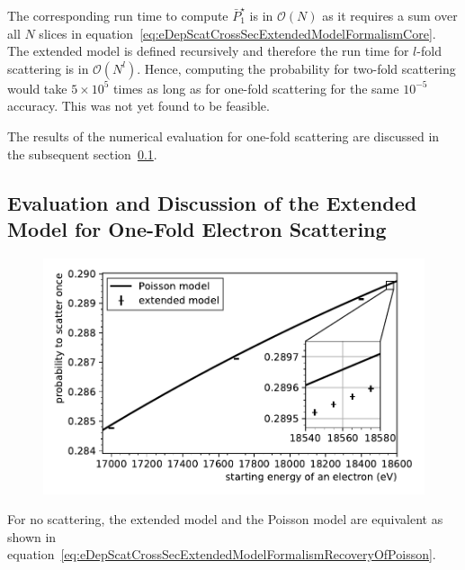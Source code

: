 The corresponding run time to compute $\bar{P}^{\star}_1$ is in $\mathcal{O}(N)$ as it requires a sum over all $N$ slices in equation~\eqref{eq:eDepScatCrossSecExtendedModelFormalismCore}. The extended model is defined recursively and therefore the run time for $l$-fold scattering is in $\mathcal{O}(N^l)$. Hence, computing the probability for two-fold scattering would take $5\times10^5$ times as long as for one-fold scattering for the same $10^{-5}$ accuracy. This was not yet found to be feasible.

The results of the numerical evaluation for one-fold scattering are discussed in the subsequent section~\ref{sec:eDepScatCrossSecExtendedModelDiscussion}.
\FloatBarrier

\subsection{Evaluation and Discussion of the Extended Model for One-Fold Electron Scattering}
\label{sec:eDepScatCrossSecExtendedModelDiscussion}
\begin{figure}[t]
	\centering
	\includegraphics{chapter/energyDependentCrossSec/fig/scatProbs1PoissonAndExtended.pdf}
	\label{fig:eDepScatCrossSecExtendedModelResults}
\end{figure}
For no scattering, the extended model and the Poisson model are equivalent as shown in equation~\eqref{eq:eDepScatCrossSecExtendedModelFormalismRecoveryOfPoisson}.

